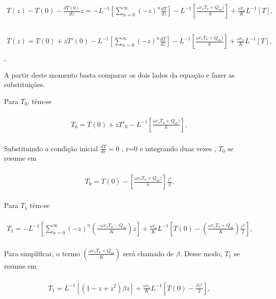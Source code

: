 \begin{gather} \nonumber\\
T(z) - T(0) - \frac{dT(0)}{dz}z = -L^{-1} \left[\sum_{n=0}^{\infty} (-z)^{n}\frac{dT}{dz}\right] - L^{-1}\left[\frac{\omega c_{s}T_{a} + Q_{m} )}{k}\right] + \frac{\omega c_s}{K}L^{-1}[T],\nonumber\\\end{gather}


\begin{gather} \nonumber\\
T(z)  = T(0) + zT'(0) -L^{-1} \left[\sum_{n=0}^{\infty} (-z)^{n}\frac{dT}{dz}\right] - L^{-1}\left[\frac{\omega c_{s}T_{a} + Q_{m} )}{k}\right] + \frac{\omega c_s}{K}L^{-1}[T],\nonumber\\\end{gather},

A partir deste momento basta comparar os dois lados da equação e fazer as substituições.

Para $T_{0}$, têm-se

\begin{gather} \nonumber\\
T_{0} = T(0) + zT'_{0} - L^{-1}\left[\frac{\omega c_{s}T_{a} + Q_{m} )}{k}\right],
\nonumber\\\end{gather}

Substituindo a condição inicial $\frac{dT}{dr} = 0$ , r=0   e integrando duas vezes , $T_{0}$ se resume em


\begin{gather} \nonumber\\
T_{0} = T(0) - \left[\frac{\omega c_{s}T_{a} + Q_{m} )}{k}\right]\frac{z^{2}}{2}.
\nonumber\\\end{gather}

Para $T_{1}$ têm-se


\begin{gather} \nonumber\\
T_{1} = -L^{-1} \left[\sum_{n=0}^{\infty} (-z)^{n}\left(\frac{-\omega c_{s} T_{a} - Q_{m}}{K}\right)z\right] + \frac{\omega c_{s}}{K}L^{-1}\left[T(0) - \left(\frac{\omega c_{s} T_{a}+Q_{m}}{K}\right)\frac{z^{2}}{2}\right],
\nonumber\\\end{gather}

Para simplificar, o termo $\left(\frac{\omega c_{s} T_{a} + Q_{m}}{K}\right)$ será chamado de $\beta$. Desse modo, $T_{1}$ se resume em


\begin{gather} \nonumber\\
T_{1} = L^{-1} \left[(1 - z + z^{2}) \beta z\right] + \frac{\omega c_{s}}{K} L^{-1} \left[T(0) - \frac{\beta z^{2}}{2}\right],
\nonumber\\\end{gather}

